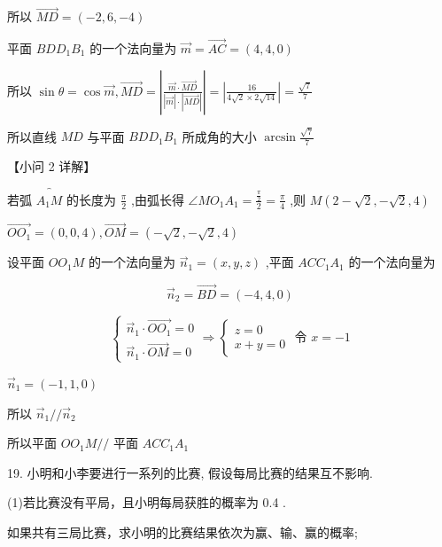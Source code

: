 \documentclass[10pt]{article}
\newcommand*\circled[1]{\tikz[baseline=(char.base)]{\node[shape=circle,draw,inner sep=1.5pt] (char) {\small #1};}}
\begin{document}
所以 \(\overrightarrow{MD} = \left( {-2,6, - 4}\right)\)

平面 \({BD}{D}_{1}{B}_{1}\) 的一个法向量为 \(\overrightarrow{m} = \overrightarrow{AC} = \left( {4,4,0}\right)\)

所以 \(\sin \theta  = \cos \overrightarrow{m},\overrightarrow{MD} = \left| \frac{\overrightarrow{m} \cdot  \overrightarrow{MD}}{\left| \overrightarrow{m}\right|  \cdot  \left| \overrightarrow{MD}\right| }\right|  = \left| \frac{16}{4\sqrt{2} \times  2\sqrt{14}}\right|  = \frac{\sqrt{7}}{7}\)

所以直线 \({MD}\) 与平面 \({BD}{D}_{1}{B}_{1}\) 所成角的大小 \(\arcsin \frac{\sqrt{7}}{7}\)

【小问 2 详解】

若弧 \(\overset{\text{ ⏜ }}{{A}_{1}M}\) 的长度为 \(\frac{\pi }{2}\) ,由弧长得 \(\angle M{O}_{1}{A}_{1} = \frac{\frac{\pi }{2}}{2} = \frac{\pi }{4}\) ,则 \(M\left( {2 - \sqrt{2}, - \sqrt{2},4}\right)\)

\(\overrightarrow{O{O}_{1}} = \left( {0,0,4}\right) ,\overrightarrow{OM} = \left( {-\sqrt{2}, - \sqrt{2},4}\right)\)

设平面 \(O{O}_{1}M\) 的一个法向量为 \({\overrightarrow{n}}_{1} = \left( {x,y,z}\right)\) ,平面 \({AC}{C}_{1}{A}_{1}\) 的一个法向量为

\[
{\overrightarrow{n}}_{2} = \overrightarrow{BD} = \left( {-4,4,0}\right)
\]

\[
\left\{  {\begin{array}{l} {\overrightarrow{n}}_{1} \cdot  \overrightarrow{O{O}_{1}} = 0 \\  {\overrightarrow{n}}_{1} \cdot  \overrightarrow{OM} = 0 \end{array} \Rightarrow  \left\{  \begin{matrix} z = 0 \\  x + y = 0 \end{matrix}\right. }\right. \text{ 令 }x =  - 1
\]

\({\overrightarrow{n}}_{1} = \left( {-1,1,0}\right)\)

所以 \({\overrightarrow{n}}_{1}//{\overrightarrow{n}}_{2}\)

所以平面 \(O{O}_{1}M//\) 平面 \({AC}{C}_{1}{A}_{1}\)

19. 小明和小李要进行一系列的比赛, 假设每局比赛的结果互不影响.

(1)若比赛没有平局，且小明每局获胜的概率为 0.4 .

 \circled{1} 如果共有三局比赛，求小明的比赛结果依次为赢、输、赢的概率;
\end{document}
